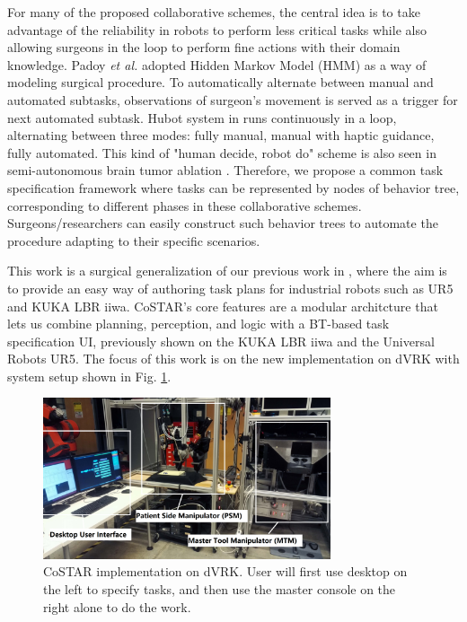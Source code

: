 \documentclass[letterpaper, 10 pt, conference]{ieeeconf}
\begin{document}
For many of the proposed collaborative schemes, the central idea is to take advantage of the reliability in robots to perform less critical tasks while also allowing surgeons in the loop to perform fine actions with their domain knowledge. Padoy \textit{et al.} \cite{padoy2011human} adopted Hidden Markov Model (HMM) as a way of modeling surgical procedure. To automatically alternate between manual and automated subtasks, observations of surgeon’s movement is served as a trigger for next automated subtask. Hubot system in \cite{berthet2016hubot} runs continuously in a loop, alternating between three modes: fully manual, manual with haptic guidance, fully automated. This kind of "human decide, robot do" scheme is also seen in semi-autonomous brain tumor ablation \cite{hu2015semi}.  Therefore, we propose a common task specification framework where tasks can be represented by nodes of behavior tree, corresponding to different phases in these collaborative schemes. Surgeons/researchers can easily construct such  behavior trees to automate the procedure adapting to their specific scenarios. 


This work is a surgical generalization of our previous work in \cite{paxton2017costar}, where the aim is to provide an easy way of authoring task plans for industrial robots such as UR5 and KUKA LBR iiwa. CoSTAR's core features are a modular architcture that lets us combine planning, perception, and logic with a BT-based task specification UI, previously shown on the KUKA LBR iiwa and the Universal Robots UR5. The focus of this work is on the new implementation on dVRK with system setup shown in Fig. \ref{fig:dvrk}. 


\begin{figure}[bt]
\centering
\includegraphics[width=240pt]{dvrk.png}
\caption{CoSTAR implementation on dVRK. User will first use desktop on the left to specify tasks, and then use the master console on the right alone to do the work.}
\label{fig:dvrk}
\end{figure}
\end{document}
